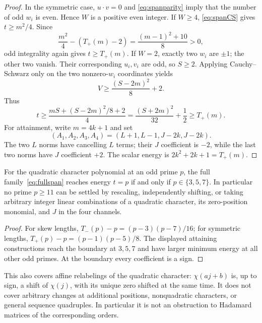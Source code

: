 \begin{proof}
In the symmetric case, $u\cdot v=0$ and
\eqref{eq:spanparity} imply that the number of odd $w_i$ is even.
Hence $W$ is a positive even integer. If $W\ge4$,
\eqref{eq:spanCS} gives $t\ge m^2/4$. Since
\[
 \frac{m^2}{4}-(T_+(m)-2)
 =\frac{(m-1)^2+10}{8}>0,
\]
odd integrality again gives $t\ge T_+(m)$. If $W=2$, exactly two
$w_i$ are $\pm1$; the other two vanish. Their corresponding $u_i,v_i$
are odd, so $S\ge2$. Applying Cauchy--Schwarz only on the two
nonzero-$w_i$ coordinates yields
\[
 V\ge\frac{(S-2m)^2}{8}+2.
\]
Thus
\[
 t\ge\frac{mS+(S-2m)^2/8+2}{4}
 =\frac{(S+2m)^2}{32}+\frac12\ge T_+(m).
\]
For attainment, write $m=4k+1$ and set
\[
 (A_1,A_2,A_3,A_4)=(L+1,L-1,J-2k,J-2k).
\]
The two $L$ norms have cancelling $L$ terms; their $J$ coefficient
is $-2$, while the last two norms have $J$ coefficient $+2$.
The scalar energy is $2k^2+2k+1=T_+(m)$.
\end{proof}

\begin{corollary}
For the quadratic character polynomial at an odd prime $p$, the full
family~\eqref{eq:fullspan} reaches energy $t=p$ if and only if
$p\in\{3,5,7\}$. In particular no prime $p\ge11$ can be settled
by rescaling, independently shifting, or taking arbitrary integer
linear combinations of a quadratic character, its zero-position
monomial, and $J$ in the four channels.
\end{corollary}
\begin{proof}
For skew lengths,
$T_-(p)-p=(p-3)(p-7)/16$; for symmetric lengths,
$T_+(p)-p=(p-1)(p-5)/8$. The displayed attaining constructions
reach the boundary at $3,5,7$ and have larger minimum energy at all
other odd primes. At the boundary every coefficient is a sign.
\end{proof}

This also covers affine relabelings of the quadratic character:
$\chi(aj+b)$ is, up to sign, a shift of $\chi(j)$, with its unique
zero shifted at the same time. It does not cover arbitrary changes
at additional positions, nonquadratic characters, or general sequence
quadruples. In particular it is not an obstruction to Hadamard matrices
of the corresponding orders.

